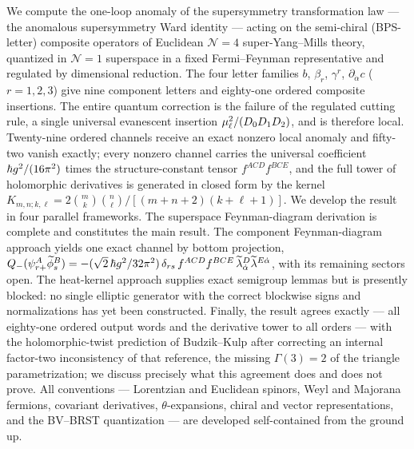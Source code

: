 We compute the one-loop anomaly of the supersymmetry transformation law ---
the anomalous supersymmetry Ward identity --- acting on the semi-chiral
(BPS-letter) composite operators of Euclidean $\mathcal N=4$
super-Yang--Mills theory, quantized in $\mathcal N=1$ superspace in a fixed
Fermi--Feynman representative and regulated by dimensional reduction. The
four letter families $b$, $\beta_r$, $\gamma^r$, $\partial_{\dot\alpha}c$
($r=1,2,3$) give nine component letters and eighty-one ordered composite
insertions. The entire quantum correction is the failure of the regulated
cutting rule, a single universal evanescent insertion
$\mu_\ell^2/(D_0D_1D_2)$, and is therefore local. Twenty-nine ordered channels
receive an exact nonzero local anomaly and fifty-two vanish exactly; every
nonzero channel carries the universal coefficient $\hbar g^2/(16\pi^2)$ times
the structure-constant tensor $f^{ACD}f^{BCE}$, and the full tower of
holomorphic derivatives is generated in closed form by the kernel
$K_{m,n;k,\ell}=2\binom{m}{k}\binom{n}{\ell}/[(m+n+2)(k+\ell+1)]$. We develop
the result in four parallel frameworks. The superspace Feynman-diagram
derivation is complete and constitutes the main result. The component
Feynman-diagram approach yields one exact channel by bottom projection,
$Q_-(\psi_{r+}^A\widetilde\phi_s^B)
=-(\sqrt2\,\hbar g^2/32\pi^2)\,\delta_{rs}\,f^{ACD}f^{BCE}\,
\widetilde\lambda_{\dot\alpha}^D\widetilde\lambda^{E\dot\alpha}$, with its
remaining sectors open. The heat-kernel approach supplies exact semigroup
lemmas but is presently blocked: no single elliptic generator with the
correct blockwise signs and normalizations has yet been constructed. Finally, the result
agrees exactly --- all eighty-one ordered output words and the derivative
tower to all orders --- with the holomorphic-twist prediction of
Budzik--Kulp after correcting an internal factor-two inconsistency of that
reference, the missing $\Gamma(3)=2$ of the triangle parametrization; we
discuss precisely what this agreement does and does not prove. All
conventions --- Lorentzian and Euclidean spinors, Weyl and Majorana
fermions, covariant derivatives, $\theta$-expansions, chiral and vector
representations, and the BV--BRST quantization --- are developed
self-contained from the ground up.
